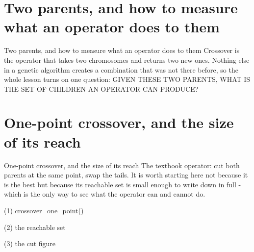 \section{Two parents, and how to measure what an operator does to them}

\begin{frame}{Two parents, and how to measure what an operator does to them}
Crossover is the operator that takes two chromosomes and returns two new ones.
Nothing else in a genetic algorithm creates a combination that was not there
before, so the whole lesson turns on one question: GIVEN THESE TWO PARENTS,
WHAT IS THE SET OF CHILDREN AN OPERATOR CAN PRODUCE?
\end{frame}


\section{One-point crossover, and the size of its reach}

\begin{frame}{One-point crossover, and the size of its reach}
The textbook operator: cut both parents at the same point, swap the tails. It is
worth starting here not because it is the best but because its reachable set is
small enough to write down in full - which is the only way to see what the
operator can and cannot do.
\end{frame}

\begin{frame}[fragile]{(1) crossover\_one\_point()}

\end{frame}

\begin{frame}[fragile]{(2) the reachable set}

\end{frame}

\begin{frame}[fragile]{(3) the cut figure}

\end{frame}

